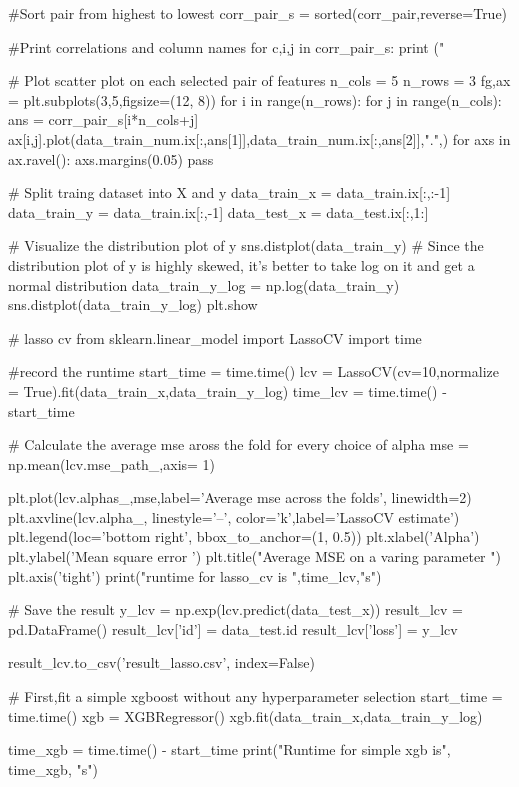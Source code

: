 \documentclass[12pt]{article}
\begin{document}
\begin{python}
#Sort pair from highest to lowest           
corr_pair_s = sorted(corr_pair,reverse=True)

#Print correlations and column names
for c,i,j in corr_pair_s:
    print ("%

# Plot scatter plot on each selected pair of features
n_cols = 5
n_rows = 3
fg,ax = plt.subplots(3,5,figsize=(12, 8))
for i in range(n_rows): 
    for j in range(n_cols):
        ans = corr_pair_s[i*n_cols+j]
        ax[i,j].plot(data_train_num.ix[:,ans[1]],data_train_num.ix[:,ans[2]],".",)
for axs in ax.ravel():
    axs.margins(0.05)
pass

# Split traing dataset into X and y
data_train_x = data_train.ix[:,:-1]
data_train_y = data_train.ix[:,-1]
data_test_x = data_test.ix[:,1:]

# Visualize the distribution plot of y 
sns.distplot(data_train_y)
# Since the distribution plot of y is highly skewed, it's better to take log on it and get a normal distribution 
data_train_y_log = np.log(data_train_y)
sns.distplot(data_train_y_log)
plt.show

# lasso cv
from sklearn.linear_model import LassoCV
import time

#record the runtime
start_time = time.time()
lcv = LassoCV(cv=10,normalize = True).fit(data_train_x,data_train_y_log)
time_lcv = time.time() - start_time

# Calculate the average mse aross the fold for every choice of alpha
mse = np.mean(lcv.mse_path_,axis= 1)


plt.plot(lcv.alphas_,mse,label='Average mse across the folds', linewidth=2)
plt.axvline(lcv.alpha_, linestyle='--', color='k',label='LassoCV estimate')
plt.legend(loc='bottom right', bbox_to_anchor=(1, 0.5))
plt.xlabel('Alpha')
plt.ylabel('Mean square error ')
plt.title("Average MSE on a varing parameter ")
plt.axis('tight')
print("runtime for lasso_cv is ",time_lcv,"s")

# Save the result
y_lcv = np.exp(lcv.predict(data_test_x))
result_lcv = pd.DataFrame()
result_lcv['id'] = data_test.id
result_lcv['loss'] = y_lcv

result_lcv.to_csv('result_lasso.csv', index=False)

# First,fit a simple xgboost without any hyperparameter selection
start_time = time.time()
xgb = XGBRegressor()
xgb.fit(data_train_x,data_train_y_log)

time_xgb = time.time() - start_time
print("Runtime for simple xgb is", time_xgb, "s")


\end{python}
\end{document}

